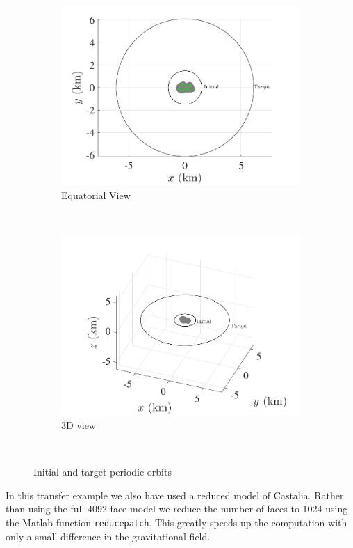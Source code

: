 \begin{figure}[htbp]
    \centering 
    \begin{subfigure}[htbp]{0.45\textwidth} 
        \includegraphics[width=\textwidth]{figures/2016_AAS/initial_transfer} 
        \caption{Equatorial View} \label{fig:eq_initial_transfer} 
    \end{subfigure}~ %
    \begin{subfigure}[htbp]{0.45\textwidth} 
        \includegraphics[width=\textwidth]{figures/2016_AAS/initial_transfer_3d} 
        \caption{3D view} \label{fig:initial_transfer_3d} 
    \end{subfigure} ~ %
    \caption{Initial and target periodic orbits}
    \label{fig:initial_transfer} 
\end{figure}
In this transfer example we also have used a reduced model of Castalia.
Rather than using the full \num{4092} face model we reduce the number of faces to \num{1024} using the Matlab function \verb+reducepatch+. 
This greatly speeds up the computation with only a small difference in the gravitational field.

